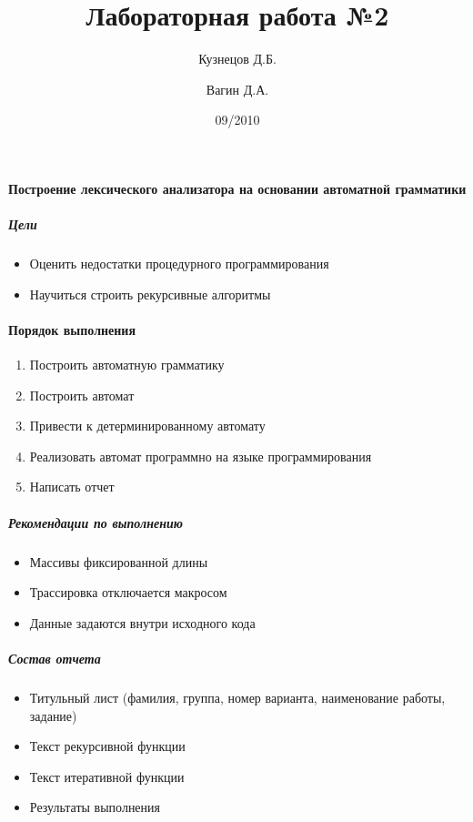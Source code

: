 \documentclass[a4paper,12pt]{article}
\title{Лабораторная работа №2}
\author{Кузнецов Д.Б.\and Вагин Д.А.}
\date{09/2010}
\begin{document}
\paragraph{Построение лексического анализатора на основании автоматной грамматики}
\subparagraph{Цели}
\begin{itemize}
	\item Оценить недостатки процедурного программирования
	\item Научиться строить рекурсивные алгоритмы
\end{itemize}

\paragraph{Порядок выполнения}
\begin{enumerate}
	\item Построить автоматную грамматику
	\item Построить автомат
	\item Привести к детерминированному автомату
	\item Реализовать автомат программно на языке программирования
	\item Написать отчет
\end{enumerate}

\subparagraph{Рекомендации по выполнению}
\begin{itemize}
	\item Массивы фиксированной длины
	\item Трассировка отключается макросом
	\item Данные задаются внутри исходного кода
\end{itemize}

\subparagraph{Состав отчета}
\begin{itemize}
	\item Титульный лист (фамилия, группа, номер варианта, наименование работы, задание)
	\item Текст рекурсивной функции
	\item Текст итеративной функции
	\item Результаты выполнения
\end{itemize}
\end{document}
